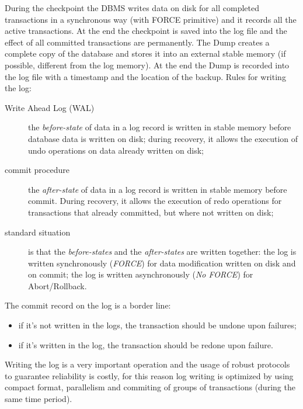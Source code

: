 During the checkpoint the DBMS writes data on disk for all completed transactions in a synchronous way (with FORCE primitive) and it records all the active transactions.
At the end the checkpoint is saved into the log file and the effect of all committed transactions are permanently.
The Dump creates a complete copy of the database and stores it into an external stable memory (if possible, different from the log memory).
At the end the Dump is recorded into the log file with a timestamp and the location of the backup.
Rules for writing the log:
\begin{description}
	\item[Write Ahead Log (WAL)] the \emph{before-state} of data in a log record is written in stable memory before database data is written on disk; during recovery, it allows the execution of undo operations on data already written on disk;
	\item[commit procedure] the \emph{after-state} of data in a log record is written in stable memory before commit.
	During recovery, it allows the execution of redo operations for transactions that already committed, but where not written on disk;
	\item[standard situation] is that the \emph{before-states} and the \emph{after-states} are written together: the log is written synchronously (\emph{FORCE}) for data modification written on disk and on commit; the log is written asynchronously (\emph{No FORCE}) for Abort/Rollback.
\end{description}
The commit record on the log is a border line:
\begin{itemize}
	\item if it's not written in the logs, the transaction should be undone upon failures;
	\item if it's written in the log, the transaction should be redone upon failure.
\end{itemize}
Writing the log is a very important operation and the usage of robust protocols to guarantee reliability is costly, for this reason log writing is optimized by using compact format, parallelism and commiting of groups of transactions (during the same time period).

